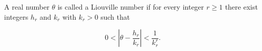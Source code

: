 A real number $\theta$ is called a Liouville number if for every integer $r \geq 1$ there exist integers $h_r$ and $k_r$ with $k_r > 0$ such that

$$0 < \left| \theta - \frac{h_r}{k_r} \right| < \frac{1}{k_r^r}.$$
